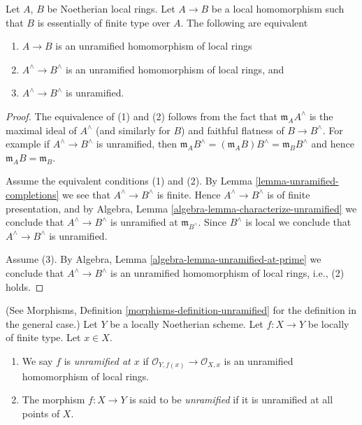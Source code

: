 \begin{lemma}
\label{lemma-characterize-unramified-completions}
Let $A$, $B$ be Noetherian local rings.
Let $A \to B$ be a local homomorphism such that $B$ is
essentially of finite type over $A$.
The following are equivalent
\begin{enumerate}
\item $A \to B$ is an unramified homomorphism of local rings
\item $A^\wedge \to B^\wedge$ is an unramified homomorphism of local rings, and
\item $A^\wedge \to B^\wedge$ is unramified.
\end{enumerate}
\end{lemma}

\begin{proof}
The equivalence of (1) and (2) follows from the fact that
$\mathfrak m_AA^\wedge$ is the maximal ideal of $A^\wedge$
(and similarly for $B$) and faithful flatness of $B \to B^\wedge$.
For example if $A^\wedge \to B^\wedge$ is unramified, then
$\mathfrak m_AB^\wedge = (\mathfrak m_AB)B^\wedge = \mathfrak m_BB^\wedge$
and hence $\mathfrak m_AB = \mathfrak m_B$.

\medskip\noindent
Assume the equivalent conditions (1) and (2).
By Lemma \ref{lemma-unramified-completions}
we see that $A^\wedge \to B^\wedge$ is
finite. Hence $A^\wedge \to B^\wedge$ is of finite presentation, and by
Algebra, Lemma \ref{algebra-lemma-characterize-unramified}
we conclude that $A^\wedge \to B^\wedge$ is unramified at
$\mathfrak m_{B^\wedge}$. Since $B^\wedge$ is local we conclude
that $A^\wedge \to B^\wedge$ is unramified.

\medskip\noindent
Assume (3). By Algebra, Lemma \ref{algebra-lemma-unramified-at-prime}
we conclude that $A^\wedge \to B^\wedge$ is an unramified homomorphism
of local rings, i.e., (2) holds.
\end{proof}

\begin{definition}
\label{definition-unramified-schemes}
(See Morphisms, Definition \ref{morphisms-definition-unramified}
for the definition in the general case.)
Let $Y$ be a locally Noetherian scheme.
Let $f : X \to Y$ be locally of finite type.
Let $x \in X$.
\begin{enumerate}
\item We say $f$ is {\it unramified at $x$} if
$\mathcal{O}_{Y, f(x)} \to \mathcal{O}_{X, x}$
is an unramified homomorphism of local rings.
\item The morphism $f : X \to Y$ is said to be {\it unramified}
if it is unramified at all points of $X$.
\end{enumerate}
\end{definition}

